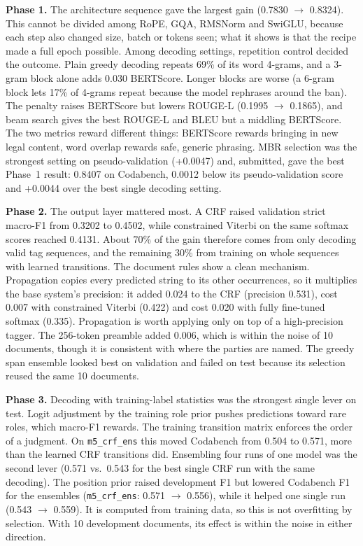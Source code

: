 \documentclass[11pt, oneside]{article}
\newcommand{\run}[1]{\texttt{#1}}
\begin{document}
\textbf{Phase 1.} The architecture sequence gave the largest gain (0.7830 $\to$ 0.8324). This cannot be divided among
RoPE, GQA, RMSNorm and SwiGLU, because each step also changed size, batch or tokens seen; what it shows is that the
recipe made a full epoch possible. Among decoding settings, repetition control decided the outcome. Plain greedy decoding repeats 69\% of
its word 4-grams, and a 3-gram block alone adds 0.030 BERTScore. Longer blocks are worse (a 6-gram block lets 17\% of
4-grams repeat because the model rephrases around the ban). The penalty raises BERTScore but lowers ROUGE-L
(0.1995 $\to$ 0.1865), and beam search gives the best ROUGE-L and BLEU but a middling BERTScore. The two metrics reward
different things: BERTScore rewards bringing in new legal content, word overlap rewards safe, generic phrasing. MBR
selection was the strongest setting on pseudo-validation (+0.0047) and, submitted, gave the best Phase~1 result:
0.8407 on Codabench, 0.0012 below its pseudo-validation score and +0.0044 over the best single decoding setting.

\textbf{Phase 2.} The output layer mattered most. A CRF raised validation strict macro-F1 from 0.3202 to 0.4502, while
constrained Viterbi on the same softmax scores reached 0.4131. About 70\% of the gain therefore comes from only
decoding valid tag sequences, and the remaining 30\% from training on whole sequences with learned transitions. The document rules show a clean mechanism. Propagation
copies every predicted string to its other occurrences, so it multiplies the base system's precision: it added 0.024
to the CRF (precision 0.531), cost 0.007 with constrained Viterbi (0.422) and cost 0.020 with fully fine-tuned softmax
(0.335). Propagation is worth applying only on top of a high-precision tagger. The 256-token preamble added 0.006, which
is within the noise of 10 documents, though it is consistent with where the parties are named. The greedy span ensemble
looked best on validation and failed on test because its selection reused the same 10 documents.

\textbf{Phase 3.} Decoding with training-label statistics was the strongest single lever on test. Logit adjustment by
the training role prior pushes predictions toward rare roles, which macro-F1 rewards. The training transition matrix
enforces the order of a judgment. On \run{m5\_crf\_ens} this moved Codabench from 0.504 to 0.571, more than the
learned CRF transitions did. Ensembling four runs of one model was the second lever (0.571 vs.\ 0.543 for the best
single CRF run with the same decoding). The position prior raised development F1 but lowered Codabench F1 for the
ensembles (\run{m5\_crf\_ens}: 0.571 $\to$ 0.556), while it helped one single run (0.543 $\to$ 0.559). It is computed
from training data, so this is not overfitting by selection. With 10 development documents, its effect is within the
noise in either direction.
\end{document}
